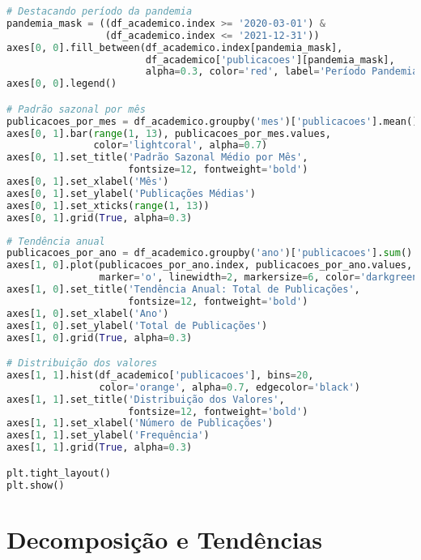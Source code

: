 \begin{pythonbox}
\begin{lstlisting}[language=Python]
# Destacando período da pandemia
pandemia_mask = ((df_academico.index >= '2020-03-01') & 
                 (df_academico.index <= '2021-12-31'))
axes[0, 0].fill_between(df_academico.index[pandemia_mask], 
                        df_academico['publicacoes'][pandemia_mask],
                        alpha=0.3, color='red', label='Período Pandemia')
axes[0, 0].legend()

# Padrão sazonal por mês
publicacoes_por_mes = df_academico.groupby('mes')['publicacoes'].mean()
axes[0, 1].bar(range(1, 13), publicacoes_por_mes.values, 
               color='lightcoral', alpha=0.7)
axes[0, 1].set_title('Padrão Sazonal Médio por Mês', 
                     fontsize=12, fontweight='bold')
axes[0, 1].set_xlabel('Mês')
axes[0, 1].set_ylabel('Publicações Médias')
axes[0, 1].set_xticks(range(1, 13))
axes[0, 1].grid(True, alpha=0.3)
\end{lstlisting}
\end{pythonbox}

\begin{pythonbox}
\begin{lstlisting}[language=Python]
# Tendência anual
publicacoes_por_ano = df_academico.groupby('ano')['publicacoes'].sum()
axes[1, 0].plot(publicacoes_por_ano.index, publicacoes_por_ano.values, 
                marker='o', linewidth=2, markersize=6, color='darkgreen')
axes[1, 0].set_title('Tendência Anual: Total de Publicações', 
                     fontsize=12, fontweight='bold')
axes[1, 0].set_xlabel('Ano')
axes[1, 0].set_ylabel('Total de Publicações')
axes[1, 0].grid(True, alpha=0.3)

# Distribuição dos valores
axes[1, 1].hist(df_academico['publicacoes'], bins=20, 
                color='orange', alpha=0.7, edgecolor='black')
axes[1, 1].set_title('Distribuição dos Valores', 
                     fontsize=12, fontweight='bold')
axes[1, 1].set_xlabel('Número de Publicações')
axes[1, 1].set_ylabel('Frequência')
axes[1, 1].grid(True, alpha=0.3)

plt.tight_layout()
plt.show()
\end{lstlisting}
\end{pythonbox}

\section{Decomposição e Tendências}

